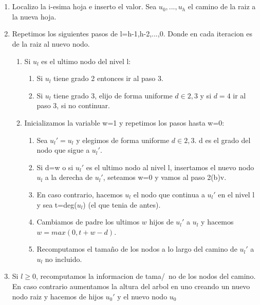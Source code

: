 \documentclass[10pt]{beamer}
\begin{document}

\section{}
\begin{frame}
\frametitle{}
\small
\begin{enumerate}\itemsep0em
  \item Localizo la i-esima hoja e inserto el valor. Sea $u_0,...,u_h$ el camino
    de la raiz a la nueva hoja.
  \item Repetimos los siguientes pasos de l=h-1,h-2,...,0. Donde en cada iteracion
    es de la raiz al nuevo nodo.
    \vspace{-0.05cm}
    \begin{enumerate}[a]\itemsep0em
      \item Si $u_l$ es el ultimo nodo del nivel l:
        \vspace{-0.05cm}
        \begin{enumerate}[i]\itemsep0em
          \item Si $u_l$ tiene grado 2 entonces ir al paso 3.
          \item Si $u_l$ tiene grado 3, elijo de forma uniforme $d\in{2,3}$ y si
            $d=4$ ir al paso 3, si no continuar.
        \end{enumerate}
      \item Inicializamos la variable w=1 y repetimos los pasos hasta w=0:
        \vspace{-0.05cm}
        \begin{enumerate}[i]\itemsep0em
          \item Sea $u_l'=u_l$ y elegimos de forma uniforme $d\in{2,3}$. d es el grado
            del nodo que sigue a $u_l'$.
          \item Si d=w o si $u_l'$ es el ultimo nodo al nivel l, insertamos el nuevo nodo $u_l$
            a la derecha de $u_l'$, seteamos w=0 y vamos al paso 2(b)v.
          \item En caso contrario, hacemos $u_l$ el nodo que continua a $u_l'$ en el nivel l y
            sea t=deg($u_l$) (el que tenia de antes).
          \item Cambiamos de padre los ultimos $w$ hijos de $u_l'$ a $u_l$ y hacemos $w=max(0, t+w-d)$.
          \item Recomputamos el tama\~no de los nodos a lo largo del camino de $u_l'$ a $u_l$ no incluido.
        \end{enumerate}
    \end{enumerate}
  \item Si $l\geq$0, recomputamos la informacion de tama/~no de los nodos del camino.
    En caso contrario aumentamos la altura del arbol en uno creando un nuevo nodo raiz
    y hacemos de hijos $u_0'$ y el nuevo nodo $u_0$
\end{enumerate}

\end{frame}
\end{document}
